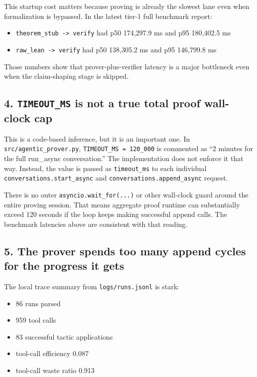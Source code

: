 \documentclass[11pt]{article}
\begin{document}
This startup cost matters because proving is already the slowest lane even when
formalization is bypassed. In the latest tier-1 full benchmark report:

\begin{itemize}[leftmargin=1.5em]
  \item \texttt{theorem\_stub -> verify} had p50 174{,}297.9 ms and p95 180{,}402.5 ms
  \item \texttt{raw\_lean -> verify} had p50 138{,}305.2 ms and p95 146{,}799.8 ms
\end{itemize}

Those numbers show that prover-plus-verifier latency is a major bottleneck even
when the claim-shaping stage is skipped.

\subsection*{4. \texttt{TIMEOUT\_MS} is not a true total proof wall-clock cap}

This is a code-based inference, but it is an important one. In
\texttt{src/agentic\_prover.py}, \texttt{TIMEOUT\_MS = 120\_000} is commented as
``2 minutes for the full run\_async conversation.'' The implementation does not
enforce it that way. Instead, the value is passed as \texttt{timeout\_ms} to
each individual \texttt{conversations.start\_async} and
\texttt{conversations.append\_async} request.

There is no outer \texttt{asyncio.wait\_for(...)} or other wall-clock guard
around the entire proving session. That means aggregate proof runtime can
substantially exceed 120 seconds if the loop keeps making successful append
calls. The benchmark latencies above are consistent with that reading.

\subsection*{5. The prover spends too many append cycles for the progress it gets}

The local trace summary from \texttt{logs/runs.jsonl} is stark:

\begin{itemize}[leftmargin=1.5em]
  \item 86 runs parsed
  \item 959 tool calls
  \item 83 successful tactic applications
  \item tool-call efficiency 0.087
  \item tool-call waste ratio 0.913
\end{itemize}
\end{document}
